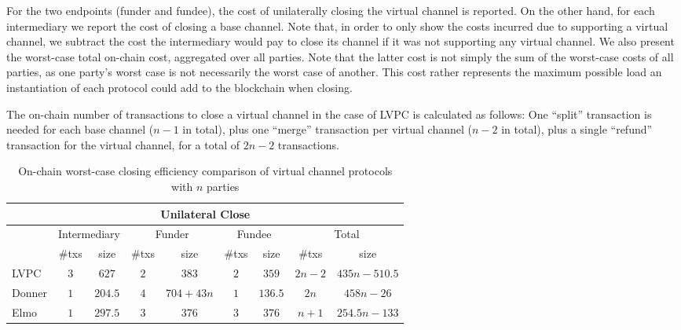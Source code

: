   For the two endpoints (funder and fundee), the cost of unilaterally closing
  the virtual channel is reported. On the other hand, for each intermediary we
  report the cost of closing a base channel. Note that, in order to only show
  the costs incurred due to supporting a virtual channel, we subtract the cost
  the intermediary would pay to close its channel if it was not supporting any
  virtual channel. We also present the worst-case total on-chain cost,
  aggregated over all parties. Note that the latter cost is not simply the sum
  of the worst-case costs of all parties, as one party's worst case is not
  necessarily the worst case of another. This cost rather represents the maximum
  possible load an instantiation of each protocol could add to the blockchain
  when closing.

  The on-chain number of transactions to close a virtual channel in the case of
  LVPC is calculated as follows: One ``split'' transaction is needed for each
  base channel ($n-1$ in total), plus one ``merge'' transaction per virtual
  channel ($n-2$ in total), plus a single ``refund'' transaction for the virtual
  channel, for a total of $2n-2$ transactions.

  \addtolength{\intextsep}{-15pt}
  \begin{table}[h!]
    \begin{minipage}{\textwidth}
    \centering
    \begin{tabular}{|l|c|c|c|c|c|c|c|c|}
    \hline
    \multicolumn{9}{|c|}{Unilateral Close} \\
    \hline
              & \multicolumn{2}{|c|}{Intermediary}
              & \multicolumn{2}{|c|}{Funder} & \multicolumn{2}{|c|}{Fundee}
              & \multicolumn{2}{|c|}{Total} \\
    \hline
              & \#txs & size & \#txs & size & \#txs & size & \#txs & size \\
    \hline
    LVPC      & $3$ & $627$ & $2$ & $383$ & $2$ & $359$ & $2n-2$ & $435n -
              510.5$ \\
    \hline
    Donner    & $1$ & $204.5$ & $4$ & $704 + 43n$ & $1$ & $136.5$ & $2n$ & $458n
              - 26$ \\
    \hline
    Elmo      & $1$ & $297.5$ & $3$ & $376$ & $3$ & $376$
              & $n+1$ & $254.5n-133$ \\
    \hline
    \end{tabular}
    \end{minipage}
    \caption{On-chain worst-case closing efficiency comparison of virtual
    channel protocols with $n$ parties}
    \label{table:comparison:overhead:n-parties:close}
  \end{table}
  \addtolength{\intextsep}{15pt}

